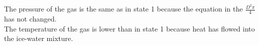 The pressure of the gas is the same as in state 1 because the equation in the \(\frac{D^2 \pi}{4}\) has not changed. \\
The temperature of the gas is lower than in state 1 because heat has flowed into the ice-water mixture.